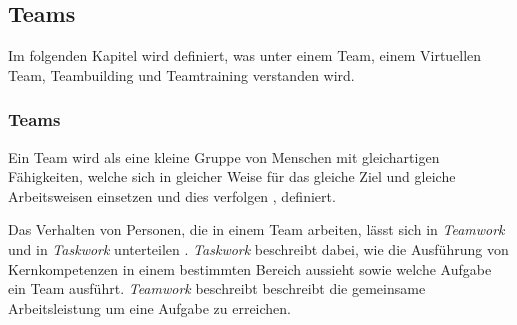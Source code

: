 \documentclass[a4paper,11pt]{article}%
\renewcommand{\\}{\vspace*{0.5\baselineskip} \newline}
\begin{document}

\newpage
	\subsection{Teams}		
	\label{Teamwork}
Im folgenden Kapitel wird definiert, was unter einem Team, einem Virtuellen Team, Teambuilding und Teamtraining verstanden wird.

\subsubsection{Teams}
\label{team}
	Ein Team wird als eine \glqq{}kleine Gruppe von Menschen mit gleichartigen Fähigkeiten, welche sich in gleicher Weise für das gleiche Ziel und gleiche Arbeitsweisen einsetzen und dies verfolgen\dq{} \citep[S.2]{zenun2007effects}, definiert.
	
Das Verhalten von Personen, die in einem Team arbeiten, lässt sich in \textit{Teamwork} und in  \textit{Taskwork} unterteilen \citep[S. 541-542]{rousseau2006teamwork}.
 \textit{Taskwork} beschreibt dabei, wie die Ausführung von Kernkompetenzen in einem bestimmten Bereich aussieht sowie welche Aufgabe ein Team ausführt.
 \textit{Teamwork} beschreibt beschreibt die gemeinsame Arbeitsleistung um eine Aufgabe zu erreichen\citep[S. 357]{marks2001temporally}.
 
\end{document}
